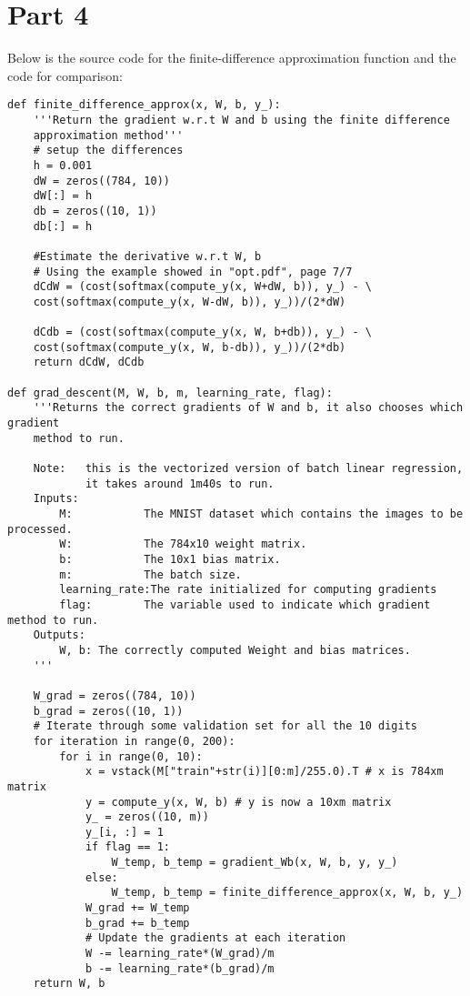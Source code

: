 \documentclass{article}
\begin{document}
\section*{Part 4}
Below is the source code for the finite-difference approximation function and the code for comparison:\\
\begin{lstlisting}
def finite_difference_approx(x, W, b, y_):
    '''Return the gradient w.r.t W and b using the finite difference
    approximation method'''
    # setup the differences
    h = 0.001
    dW = zeros((784, 10))
    dW[:] = h
    db = zeros((10, 1))
    db[:] = h
    
    #Estimate the derivative w.r.t W, b
    # Using the example showed in "opt.pdf", page 7/7
    dCdW = (cost(softmax(compute_y(x, W+dW, b)), y_) - \
    cost(softmax(compute_y(x, W-dW, b)), y_))/(2*dW)
    
    dCdb = (cost(softmax(compute_y(x, W, b+db)), y_) - \
    cost(softmax(compute_y(x, W, b-db)), y_))/(2*db)
    return dCdW, dCdb
    
def grad_descent(M, W, b, m, learning_rate, flag):
    '''Returns the correct gradients of W and b, it also chooses which gradient 
    method to run.
    
    Note:   this is the vectorized version of batch linear regression, 
            it takes around 1m40s to run.
    Inputs:
        M:           The MNIST dataset which contains the images to be processed.
        W:           The 784x10 weight matrix.
        b:           The 10x1 bias matrix.
        m:           The batch size.
        learning_rate:The rate initialized for computing gradients
        flag:        The variable used to indicate which gradient method to run.
    Outputs:
        W, b: The correctly computed Weight and bias matrices.
    '''
    
    W_grad = zeros((784, 10))
    b_grad = zeros((10, 1))
    # Iterate through some validation set for all the 10 digits
    for iteration in range(0, 200):
        for i in range(0, 10):
            x = vstack(M["train"+str(i)][0:m]/255.0).T # x is 784xm matrix
            y = compute_y(x, W, b) # y is now a 10xm matrix
            y_ = zeros((10, m))
            y_[i, :] = 1
            if flag == 1:
                W_temp, b_temp = gradient_Wb(x, W, b, y, y_)
            else:
                W_temp, b_temp = finite_difference_approx(x, W, b, y_)
            W_grad += W_temp
            b_grad += b_temp
            # Update the gradients at each iteration
            W -= learning_rate*(W_grad)/m
            b -= learning_rate*(b_grad)/m
    return W, b   


\end{lstlisting}
\end{document}
